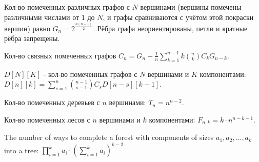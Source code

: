 Кол-во помеченных различных графов с $N$ вершинами (вершины помечены различными числами от $1$ до $N$, и графы сравниваются с учётом этой покраски
вершин) равно $G_n = 2^{\frac{n(n-1)}{2}}$. Рёбра графа неориентированы, петли и кратные рёбра запрещены.

Кол-во связных помеченных графов $C_n = G_n - \frac{1}{n} \sum \limits_{k=1}^{n-1} k \binom{n}{k} C_k G_{n-k}$.

$D[N][K]$ - кол-во помеченных графов с $N$ вершинами и $K$ компонентами: $D[n][k] = \sum \limits_{s=1}^{n} \binom{n-1}{s-1} C_s D[n-s][k-1]$.

Кол-во помеченных деревьев с $n$ вершинами: $T_n = n ^ {n - 2}$.

Кол-во помеченных лесов с $n$ вершинами и $k$ компонентами:
$F_{n,k} = k \cdot n^{n-k-1}$.

The number of ways to complete a forest with components of sizes $a_1, a_2, \dots, a_k$ into a tree: $\prod \limits_{i=1}^k a_i \cdot \left(\sum \limits_{i=1}^k a_i \right)^{k-2}$